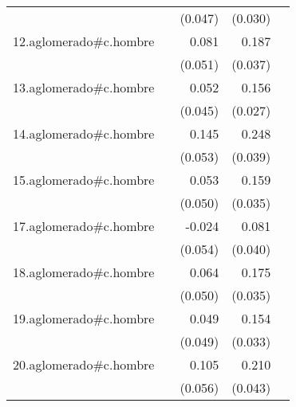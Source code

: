 {\begin{longtable}{l*{4}{D{.}{.}{-1}}}
            &                     &     (0.047)         &     (0.030)         &                     \\
\addlinespace
12.aglomerado#c.hombre&                     &       0.081         &       0.187\sym{***}&                     \\
            &                     &     (0.051)         &     (0.037)         &                     \\
\addlinespace
13.aglomerado#c.hombre&                     &       0.052         &       0.156\sym{***}&                     \\
            &                     &     (0.045)         &     (0.027)         &                     \\
\addlinespace
14.aglomerado#c.hombre&                     &       0.145\sym{**} &       0.248\sym{***}&                     \\
            &                     &     (0.053)         &     (0.039)         &                     \\
\addlinespace
15.aglomerado#c.hombre&                     &       0.053         &       0.159\sym{***}&                     \\
            &                     &     (0.050)         &     (0.035)         &                     \\
\addlinespace
17.aglomerado#c.hombre&                     &      -0.024         &       0.081\sym{*}  &                     \\
            &                     &     (0.054)         &     (0.040)         &                     \\
\addlinespace
18.aglomerado#c.hombre&                     &       0.064         &       0.175\sym{***}&                     \\
            &                     &     (0.050)         &     (0.035)         &                     \\
\addlinespace
19.aglomerado#c.hombre&                     &       0.049         &       0.154\sym{***}&                     \\
            &                     &     (0.049)         &     (0.033)         &                     \\
\addlinespace
20.aglomerado#c.hombre&                     &       0.105         &       0.210\sym{***}&                     \\
            &                     &     (0.056)         &     (0.043)         &                     \\

\end{longtable}}
